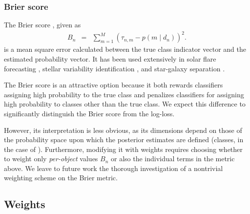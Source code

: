 \subsubsection{Brier score}
\label{sec:brier}

The Brier score \cite{brier_verification_1950}, given as
\begin{eqnarray}
  \label{eq:brier}
B_{n} &=& \sum_{m=1}^{M}(\tau_{n, m}-p(m \mid d_{n}))^{2}.
\end{eqnarray}
is a mean square error calculated between the true class indicator vector and the estimated probability vector.
It has been used extensively in solar flare forecasting \cite{crown_validation, mays_ensemble_2015, florios_forecasting_2018}, stellar variability identification \citep{richards_construction_2012, armstrong_k2_2016}, and star-galaxy separation \citep{kim_hybrid_2015}.

The Brier score is an attractive option because it both rewards classifiers assigning high probability to the true class and penalizes classifiers for assigning high probability to classes other than the true class.
We expect this difference to significantly distinguish the Brier score from the log-loss.

However, its interpretation is less obvious, as its dimensions depend on those of the probability space upon which the posterior estimates are defined (classes, in the case of \plasticc).
Furthermore, modifying it with weights requires choosing whether to weight only \textit{per-object} values $B_{n}$ or also the individual terms in the metric above.
We leave to future work the thorough investigation of a nontrivial weighting scheme on the Brier metric.


%

\subsection{Weights}
\label{sec:weights}


